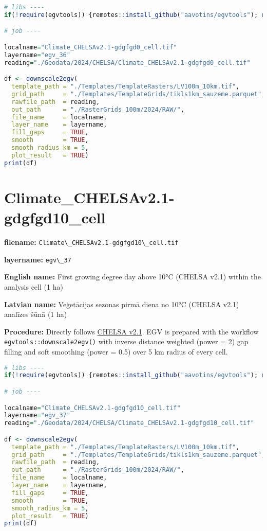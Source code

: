 \documentclass[
]{book}
\newcommand{\passthrough}[1]{#1}
\begin{document}
\begin{lstlisting}[language=R]
# libs ----
if(!require(egvtools)) {remotes::install_github("aavotins/egvtools"); require(egvtools)}

# job ----

localname="Climate_CHELSAv2.1-gdgfgd0_cell.tif"
layername="egv_36"
reading="./Geodata/2024/CHELSA/Climate_CHELSAv2.1-gdgfgd0_cell.tif"

df <- downscale2egv(
  template_path = "./Templates/TemplateRasters/LV100m_10km.tif",
  grid_path     = "./Templates/TemplateGrids/tikls1km_sauzeme.parquet",
  rawfile_path  = reading,
  out_path      = "./RasterGrids_100m/2024/RAW/",
  file_name     = localname,
  layer_name    = layername,
  fill_gaps     = TRUE,
  smooth        = TRUE,
  smooth_radius_km = 5,
  plot_result   = TRUE)
print(df)
\end{lstlisting}

\section{Climate\_CHELSAv2.1-gdgfgd10\_cell}\label{ch06.037}

\textbf{filename:} \passthrough{\lstinline!Climate\_CHELSAv2.1-gdgfgd10\_cell.tif!}

\textbf{layername:} \passthrough{\lstinline!egv\_37!}

\textbf{English name:} First growing degree day above 10°C (CHELSA v2.1) within the analysis cell (1 ha)

\textbf{Latvian name:} Veģetācijas sezonas pirmā diena no 10°C (CHELSA v2.1) analīzes šūnā (1 ha)

\textbf{Procedure:} Directly follows \hyperref[Ch04.11]{CHELSA v2.1}. EGV is prepared with the
workflow \passthrough{\lstinline!egvtools::downscale2egv()!} with inverse distance weighted (power = 2)
gap filling and soft smoothing (power = 0.5) over 5 km radius of every cell.

\begin{lstlisting}[language=R]
# libs ----
if(!require(egvtools)) {remotes::install_github("aavotins/egvtools"); require(egvtools)}

# job ----

localname="Climate_CHELSAv2.1-gdgfgd10_cell.tif"
layername="egv_37"
reading="./Geodata/2024/CHELSA/Climate_CHELSAv2.1-gdgfgd10_cell.tif"

df <- downscale2egv(
  template_path = "./Templates/TemplateRasters/LV100m_10km.tif",
  grid_path     = "./Templates/TemplateGrids/tikls1km_sauzeme.parquet",
  rawfile_path  = reading,
  out_path      = "./RasterGrids_100m/2024/RAW/",
  file_name     = localname,
  layer_name    = layername,
  fill_gaps     = TRUE,
  smooth        = TRUE,
  smooth_radius_km = 5,
  plot_result   = TRUE)
print(df)
\end{lstlisting}
\end{document}
